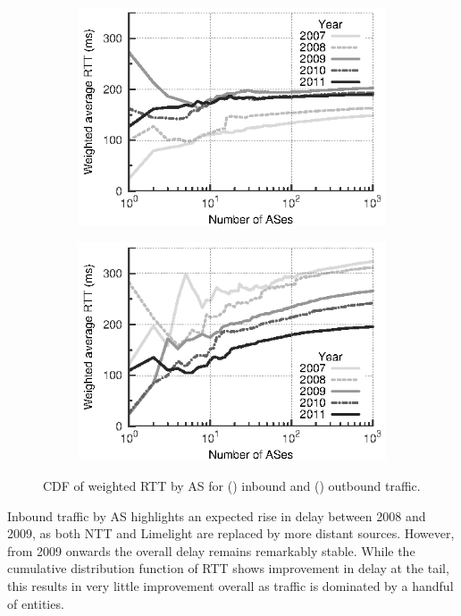 \begin{figure}
    \centering
    \begin{subfigure}[b]{0.5\linewidth}
        \includegraphics{figures/malawi/rtt_wcdf_in}
        \caption{\label{fig:rtt_wcdf_in}}
    \end{subfigure}%
    \begin{subfigure}[b]{0.5\linewidth}
        \includegraphics{figures/malawi/rtt_wcdf_out}
        \caption{\label{fig:rtt_wcdf_out}}
    \end{subfigure}%
    \caption[\acs{CDF} of weighted \acs{RTT} by \acs{AS}.]{\acs{CDF} of weighted \acs{RTT} by \acs{AS} for () inbound and () outbound traffic. \label{fig:rtt_wcdf}}
\end{figure}

Inbound traffic by \ac{AS} highlights an expected rise in delay between 2008 and 2009, as both \acs{NTT} and Limelight are replaced by more distant sources. 
However, from 2009 onwards the overall delay remains remarkably stable. 
While the cumulative distribution function of \ac{RTT} shows improvement in delay at the tail, this results in very little improvement overall as traffic is dominated by a handful of entities.

